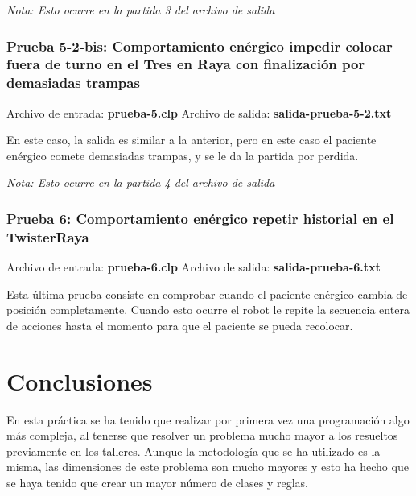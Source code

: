 \documentclass{uc3mpracticas}
\begin{document}
  \textit{Nota: Esto ocurre en la partida 3 del archivo de salida}

  \subsubsection{Prueba 5-2-bis: Comportamiento enérgico impedir colocar fuera de turno en el Tres en Raya con finalización por demasiadas trampas}


  Archivo de entrada: \textbf{prueba-5.clp} \hspace{15mm} Archivo de salida: \textbf{salida-prueba-5-2.txt}

  \vspace{2mm}

  En este caso, la salida es similar a la anterior, pero en este caso el paciente enérgico comete demasiadas trampas, y se le da la partida por perdida.

  \vspace{1mm}

  \textit{Nota: Esto ocurre en la partida 4 del archivo de salida}


  \subsubsection{Prueba 6: Comportamiento enérgico repetir historial en el TwisterRaya}


  Archivo de entrada: \textbf{prueba-6.clp} \hspace{15mm} Archivo de salida: \textbf{salida-prueba-6.txt}

  \vspace{2mm}

  Esta última prueba consiste en comprobar cuando el paciente enérgico cambia de posición completamente. Cuando esto ocurre el robot le repite la secuencia entera de acciones hasta el momento para que el paciente se pueda recolocar.


  \newpage

  \section{Conclusiones}

  En esta práctica se ha tenido que realizar por primera vez una programación algo más compleja, al tenerse que resolver un problema mucho mayor a los resueltos previamente en los talleres. Aunque la metodología que se ha utilizado es la misma, las dimensiones de este problema son mucho mayores y esto ha hecho que se haya tenido que crear un mayor número de clases y reglas.
\end{document}
